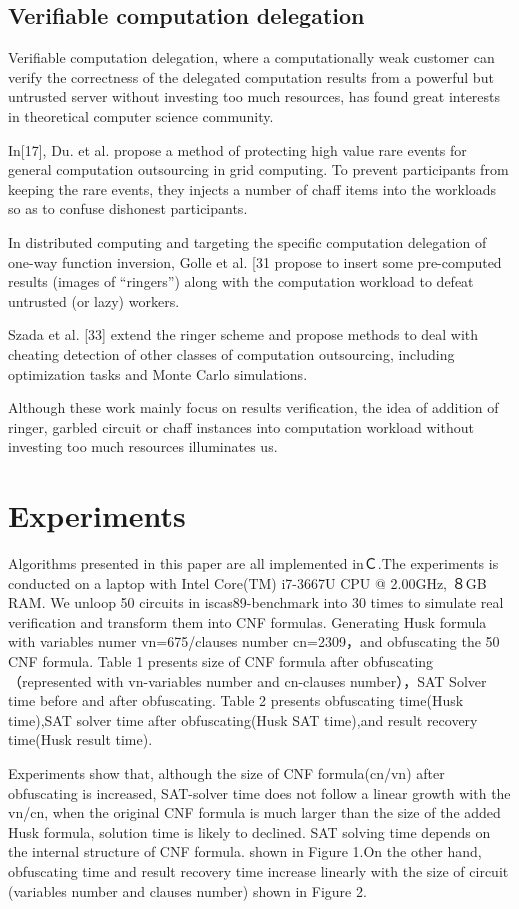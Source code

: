 \documentclass[runningheads,a4paper]{llncs}
\begin{document}
\subsection{Verifiable computation delegation}

Verifiable computation delegation, where a computationally weak customer can verify the correctness of the delegated computation results from a powerful but untrusted server without investing too much resources, has found great interests in theoretical computer science community.

In[17], Du. et al. propose a method of protecting high value rare events for general computation outsourcing in grid computing. To prevent participants from keeping the rare events, they injects a number of chaff items into the workloads so as to confuse dishonest participants.

In distributed computing and targeting the specific computation delegation of one-way function inversion, Golle et al. [31 propose to insert some pre-computed results (images of “ringers”) along with the computation workload to defeat untrusted (or lazy) workers. 

Szada et al. [33] extend the ringer scheme and propose methods to deal with cheating detection of other classes of computation outsourcing, including optimization tasks and Monte Carlo simulations.

Although these work mainly focus on results verification, the idea of addition of ringer, garbled circuit or chaff instances into computation workload without investing too much resources illuminates us.
\section{Experiments} 

Algorithms presented in this paper are all implemented inＣ.The experiments is conducted on a laptop with Intel Core(TM) i7-3667U CPU @ 2.00GHz, ８GB RAM. We unloop 50 circuits in iscas89-benchmark into 30 times to simulate real verification and transform them into CNF formulas. Generating Husk formula with variables numer vn=675/clauses number cn=2309，and obfuscating the 50 CNF formula. Table 1 presents size of CNF formula after obfuscating（represented with vn-variables number and cn-clauses number），SAT Solver time before and after obfuscating. Table 2 presents obfuscating time(Husk time),SAT solver time after obfuscating(Husk SAT time),and result recovery time(Husk result time).

Experiments show that, although the size of CNF formula(cn/vn) after obfuscating is increased, SAT-solver time does not follow a linear growth with the vn/cn, when the original CNF formula is much larger than the size of the added Husk formula, solution time is likely to declined. SAT solving time depends on the internal structure of CNF formula. shown in Figure 1.On the other hand, obfuscating time and result recovery time increase linearly with the size of circuit (variables number and clauses number) shown in Figure 2.
\end{document}
